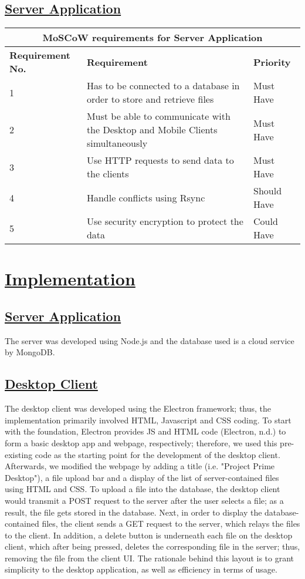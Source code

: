 \documentclass{article}
\begin{document}
\subsection{\underline{Server Application}}

\begin{tabular}{|p{3cm}|p{5cm}|p{4cm}|}
\hline
\multicolumn{3}{|c|}{\textbf{MoSCoW requirements for Server Application}} \\
\hline
\textbf{Requirement No.} & \textbf{Requirement} & \textbf{Priority}\\
\hline
1 & Has to be connected to a database in order to store and retrieve files & Must Have \\
\hline
2 & Must be able to communicate with the Desktop and Mobile Clients simultaneously & Must Have \\
\hline
3 & Use HTTP requests to send data to the clients & Must Have \\
\hline
4 & Handle conflicts using Rsync & Should Have \\
\hline
5 & Use security encryption to protect the data & Could Have\\
\hline
\end{tabular}

\section{\underline{Implementation}}
\subsection{\underline{Server Application}}
The server was developed using Node.js and the database used is a cloud service by MongoDB.

\subsection{\underline{Desktop Client}}
The desktop client was developed using the Electron framework; thus, the implementation primarily involved HTML, Javascript and CSS coding. To start with the foundation, Electron provides JS and HTML code (Electron, n.d.) to form a basic desktop app and webpage, respectively; therefore, we used this pre-existing code as the starting point for the development of the desktop client. Afterwards, we modified the webpage by adding a title (i.e. "Project Prime Desktop"), a file upload bar and a display of the list of server-contained files using HTML and CSS. To upload a file into the database, the desktop client would transmit a POST request to the server after the user selects a file; as a result, the file gets stored in the database. Next, in order to display the database-contained files, the client sends a GET request to the server, which relays the files to the client. In addition, a delete button is underneath each file on the desktop client, which after being pressed, deletes the corresponding file in the server; thus, removing the file from the client UI. The rationale behind this layout is to grant simplicity to the desktop application, as well as efficiency in terms of usage. 
\end{document}
